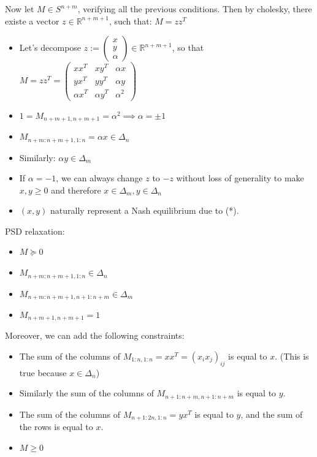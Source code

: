 \documentclass[11pt]{article}
\begin{document}
Now let \(M \in S^{n+m}\), verifying all the previous conditions. Then by cholesky, there existe a vector \(z \in \mathbb R^{n+m+1}\), such that: \(M = zz^T\)

\begin{itemize}
\item Let's decompose \(z := \begin{pmatrix}x \\ y\\\alpha\end{pmatrix} \in \mathbb R^{n+m+1}\), so that \(M = zz^T = \begin{pmatrix}xx^T&xy^T&\alpha x\\yx^T&yy^T&\alpha y\\\alpha x^T&\alpha y^T&\alpha^2\end{pmatrix}\)
\item \(1 = M_{n+m+1, n+m+1} = \alpha^2 \implies \alpha=\pm 1\)
\item \(M_{n+m:n+m+1, 1:n} = \alpha x \in \Delta_n\)
\item Similarly: \(\alpha y \in \Delta_m\)
\item If \(\alpha = -1\), we can always change \(z\) to \(-z\) without loss of generality to make \(x, y \ge 0\) and therefore \(x \in \Delta_m, y \in \Delta_n\)
\item \((x, y)\) naturally represent a Nash equilibrium due to (*).
\end{itemize}

PSD relaxation:
\begin{itemize}
\item \(M \succeq 0\)
\item \(M_{n+m:n+m+1, 1:n} \in \Delta_n\)
\item \(M_{n+m:n+m+1, n+1:n+m} \in \Delta_m\)
\item \(M_{n+m+1, n+m+1} = 1\)
\end{itemize}

Moreover, we can add the following constraints:

\begin{itemize}
\item The sum of the columns of \(M_{1:n, 1:n} = xx^T = (x_ix_j)_{ij}\) is equal to \(x\). (This is true because \(x \in \Delta_n\))
\item Similarly the sum of the columns of \(M_{n+1:n+m, n+1:n+m}\) is equal to \(y\).
\item The sum of the columns of \(M_{n+1:2n, 1:n} = yx^T\) is equal to \(y\), and the sum of the rows is equal to \(x\).
\item \(M \ge 0\)
\end{itemize}
\end{document}
